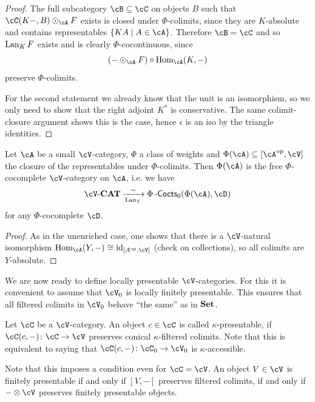 \documentclass[a4paper,11pt,oneside,openany]{scrbook}
\begin{document}
\begin{proof}
	The full subcategory $ \cB \subseteq \cC $ on objects $ B $ such that $ \cC(K-,B)\odot _\cA F $ exists is closed under $ \Phi $-colimits, since they are $ K $-absolute and contains representables $ \{ KA \mid A \in \cA \} $.
	Therefore $ \cB = \cC $ and so $ \operatorname{Lan}_K F $ exists and is clearly $ \Phi $-cocontinuous, since
	\begin{displaymath}
		(- \odot _\cA F) \circ \Hom_\cA (K,-)
	\end{displaymath}
	preserve $ \Phi $-colimits.

	For the second statement we already know that the unit is an isomorphism, so we only need to show that the right adjoint $ K^* $ is conservative.
	The same colimit-closure argument shows this is the case, hence $ \epsilon $ is an iso by the triangle identities.
\end{proof}
\begin{cor}
	Let $ \cA $ be a small $ \cV $-category, $ \Phi $ a class of weights and $ \Phi(\cA) \subseteq [\cA^{\op},\cV] $ the closure of the representables under $ \Phi $-colimits.
	Then $ \Phi(\cA) $ is the free $ \Phi $-cocomplete $ \cV $-category on $ \cA $, i.e. we have
	\begin{displaymath}
		\cV\text{-}\CAT \xrightarrow[\Lan_Y]{\sim} \Phi\Cocts_0(\Phi(\cA),\cD)
	\end{displaymath}
	for any $ \Phi $-cocomplete $ \cD $.
\end{cor}
\begin{proof}
	As in the unenriched case, one shows that there is a $ \cV $-natural isomorphism $ \Hom_\cA(Y,-)\iso \id_{[A^{\op}, \cV]} $ (check on collections),
	so all colimits are $ Y $-absolute.
\end{proof}
We are now ready to define locally presentable $ \cV $-categories.
For this it is convenient to assume that $ \cV_0 $ is locally finitely presentable.
This ensures that all filtered colimits in $ \cV_0 $ behave ``the same'' as in $ {\normalfont\textbf{Set}} $.

\begin{defn}
	Let $ \cC $ be a $ \cV $-category.
	An object $ c \in \cC $ is called $ \kappa $-presentable, if $ \cC(c,-) \from \cC \to \cV $ preserves conical $ \kappa $-filtered colimits.
	Note that this is equivalent to saying that $ \cC (c,-)\from \cC_0 \to \cV_0 $ is $ \kappa $-accessible.
\end{defn}

Note that this imposes a condition even for $ \cC = \cV $.
An object $ V \in \cV $ is finitely presentable if and only if $ [V,-] $ preserves filtered colimits, if and only if $ -\otimes \cV $ preserves finitely presentable objects.
\end{document}
